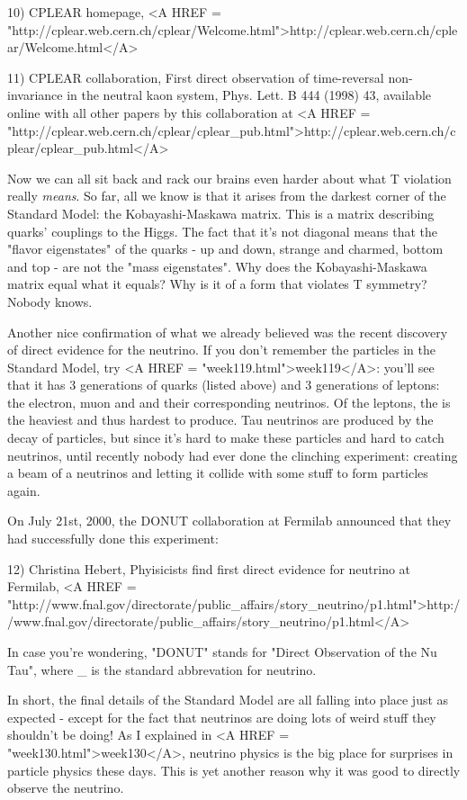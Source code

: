 10) CPLEAR homepage, <A HREF = "http://cplear.web.cern.ch/cplear/Welcome.html">http://cplear.web.cern.ch/cplear/Welcome.html</A>

11) CPLEAR collaboration, First direct observation of time-reversal 
non-invariance in the neutral kaon system, Phys. Lett. B 444 (1998) 43,
available online with all other papers by this collaboration at
<A HREF = "http://cplear.web.cern.ch/cplear/cplear_pub.html">http://cplear.web.cern.ch/cplear/cplear_pub.html</A>

Now we can all sit back and rack our brains even harder about what
T violation really \emph{means}.  So far, all we know is that it arises
from the darkest corner of the Standard Model: the Kobayashi-Maskawa 
matrix.  This is a matrix describing quarks' couplings to the Higgs.
The fact that it's not diagonal means that the "flavor eigenstates"
of the quarks - up and down, strange and charmed, bottom and top - 
are not the "mass eigenstates".   Why does the Kobayashi-Maskawa 
matrix equal what it equals?   Why is it of a form that violates 
T symmetry?  Nobody knows.

Another nice confirmation of what we already believed was the recent
discovery of direct evidence for the \tau  neutrino.  If you don't
remember the particles in the Standard Model, try <A HREF = "week119.html">week119</A>: you'll
see that it has 3 generations of quarks (listed above) and 3 generations 
of leptons: the electron, muon and \tau  and their corresponding neutrinos.
Of the leptons, the \tau  is the heaviest and thus hardest to produce.  Tau 
neutrinos are produced by the decay of \tau  particles, but since it's hard
to make these particles and hard to catch neutrinos, until recently nobody 
had ever done the clinching experiment: creating a beam of a \tau  neutrinos 
and letting it collide with some stuff to form \tau  particles again.   

On July 21st, 2000, the DONUT collaboration at Fermilab announced that 
they had successfully done this experiment:

12) Christina Hebert, Phyisicists find first direct evidence for \tau 
neutrino at Fermilab, 
<A HREF = "http://www.fnal.gov/directorate/public_affairs/story_neutrino/p1.html">http://www.fnal.gov/directorate/public_affairs/story_neutrino/p1.html</A>

In case you're wondering, "DONUT" stands for "Direct Observation of 
the Nu Tau", where \nu _{\tau } is the standard abbrevation for \tau  neutrino.

In short, the final details of the Standard Model are all falling
into place just as expected - except for the fact that neutrinos are
doing lots of weird stuff they shouldn't be doing!  As I explained in 
<A HREF = "week130.html">week130</A>, neutrino physics is the big place for surprises in particle
physics these days.  This is yet another reason why it was good to 
directly observe the \tau  neutrino.

